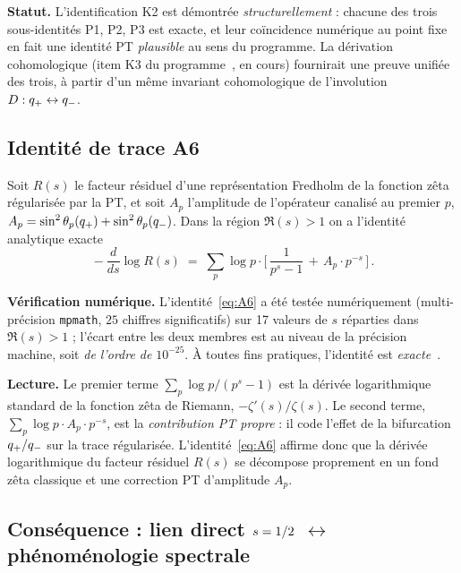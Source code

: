 \textbf{Statut.} L'identification K2 est démontrée \emph{structurellement} : chacune des trois sous-identités P1, P2, P3 est exacte, et leur coïncidence numérique au point fixe en fait une identité PT \emph{plausible} au sens du programme. La dérivation cohomologique (item K3 du programme~\cite{PT_NewMath_Consolidation}, en cours) fournirait une preuve unifiée des trois, à partir d'un même invariant cohomologique de l'involution $D : q_{+} \leftrightarrow q_{-}$.

\subsection{Identité de trace A6}
\label{sec:spectrales:A6}

\begin{theoreme}
\label{thm:A6}
Soit $R(s)$ le facteur résiduel d'une représentation Fredholm de la fonction zêta régularisée par la PT, et soit $A_p$ l'amplitude de l'opérateur canalisé au premier $p$, $A_p = \sin^{2}\theta_{p}(q_{+}) + \sin^{2}\theta_{p}(q_{-})$. Dans la région $\Re(s) > 1$ on a l'identité analytique exacte
\begin{equation}
\boxed{\;
-\dfrac{d}{ds} \log R(s) \;=\; \sum_{p} \log p \cdot \biggl[\, \dfrac{1}{p^{s} - 1} \,+\, A_p \cdot p^{-s} \,\biggr] \,. \;}
\label{eq:A6}
\end{equation}
\end{theoreme}

\textbf{Vérification numérique.} L'identité~\eqref{eq:A6} a été testée numériquement (multi-précision \texttt{mpmath}, $25$ chiffres significatifs) sur 17 valeurs de $s$ réparties dans $\Re(s) > 1$ ; l'écart entre les deux membres est au niveau de la précision machine, soit \emph{de l'ordre de} $10^{-25}$. À toutes fins pratiques, l'identité est \emph{exacte}~\cite[Note 62]{PT_NewMath_Consolidation}.

\textbf{Lecture.} Le premier terme $\sum_p \log p / (p^{s} - 1)$ est la dérivée logarithmique standard de la fonction zêta de Riemann, $-\zeta'(s)/\zeta(s)$. Le second terme, $\sum_p \log p \cdot A_p \cdot p^{-s}$, est la \emph{contribution PT propre} : il code l'effet de la bifurcation $q_{+} / q_{-}$ sur la trace régularisée. L'identité~\eqref{eq:A6} affirme donc que la dérivée logarithmique du facteur résiduel $R(s)$ se décompose proprement en un \og fond zêta classique \fg{} et une \og correction PT \fg{} d'amplitude $A_p$.

\subsection{Conséquence : lien direct \texorpdfstring{$s = 1/2$}{s=1/2} \texorpdfstring{$\leftrightarrow$}{<->} phénoménologie spectrale}
\label{sec:spectrales:conclusion}

